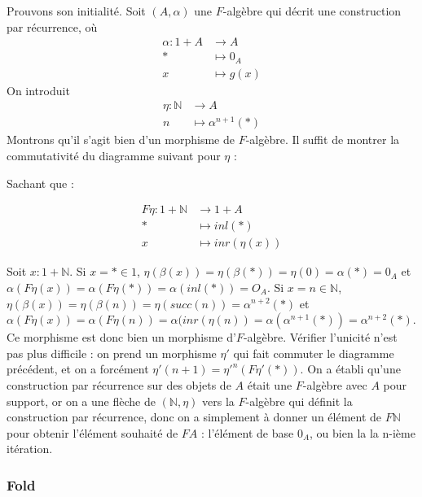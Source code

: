 \documentclass{article}
\newcommand{\N}{\mathbb{N}}
\begin{document}
Prouvons son initialité. Soit $(A, \alpha)$ une $F$-algèbre qui décrit une construction par récurrence, où 
\begin{align*}
    \alpha : 1 + A & \rightarrow A \\ 
    * & \mapsto 0_A \\ 
    x & \mapsto g(x)
\end{align*}
On introduit
\begin{align*}
    \eta : \N & \rightarrow  A \\ 
    n & \mapsto \alpha^{n+1}(*)    
\end{align*} 
Montrons qu'il s'agit bien d'un morphisme de $F$-algèbre. Il suffit de montrer la commutativité du diagramme suivant pour $\eta$ : 
\begin{center}
\end{center}

Sachant que :

\begin{align*}
    F \eta : 1 + \N & \rightarrow 1 + A \\ 
        * & \mapsto inl(*) \\ 
        x & \mapsto inr(\eta(x))  
\end{align*}

Soit $x : 1 + \N$. Si $x = * \in 1$, $ \eta(\beta(x)) = \eta(\beta(*)) = \eta(0) = \alpha(*) = 0_A $ et $ \alpha(F \eta (x)) = \alpha( F \eta (*)) = \alpha(inl(*)) = O_A $. Si $x = n \in \N$, $ \eta(\beta(x)) = \eta(\beta(n)) = \eta(succ(n)) = \alpha^{n+2}(*) $ et $ \alpha( F \eta (x)) = \alpha(F \eta (n)) = \alpha(inr(\eta(n)) = \alpha(\alpha^{n+1}(*)) = \alpha^{n+2}(*) $. Ce morphisme est donc bien un morphisme d'$F$-algèbre. Vérifier l'unicité n'est pas plus difficile : on prend un morphisme $\eta'$ qui fait commuter le diagramme précédent, et on a forcément $\eta'(n+1) = \eta'^n(F\eta'(*)) $. On a établi qu'une construction par récurrence sur des objets de $A$ était une $F$-algèbre avec $A$ pour support, or on a une flèche de $(\N, \eta)$ vers la $F$-algèbre qui définit la construction par récurrence, donc on a simplement à donner un élément de $F\N$ pour obtenir l'élément souhaité de $FA$ : l'élément de base $0_A$, ou bien la la n-ième itération. 


\subsubsection{Fold}
\end{document}
